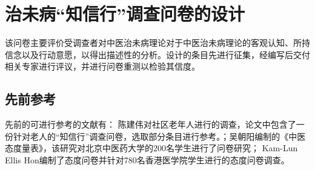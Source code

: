 \section{治未病“知信行”调查问卷的设计}
该问卷主要评价受调查者对中医治未病理论对于中医治未病理论的客观认知、所持信念以及行动意愿，以得出描述性的分析。设计的条目先进行征集，经编写后交付相关专家进行评议，并进行问卷重测以检验其信度。
\subsection{先前参考}
先前的可进行参考的文献有：
陈建伟对社区老年人进行的调查\cite{cjw_1_2009}，论文中包含了一份针对老人的“知信行”调查问卷，选取部分条目进行参考。；吴朝阳\cite{wcy2011}编制的《中医态度量表》，该研究对北京中医药大学的200名学生进行了问卷研究；
Kam-Lun Ellis Hon\cite{kam2005}编制了态度问卷并针对780名香港医学院学生进行的态度问卷调查。

